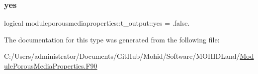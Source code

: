 \mbox{\label{structmoduleporousmediaproperties_1_1t__output_a82afbf45cd736a34347d080a45bc1acd}} 
\subsubsection{\texorpdfstring{yes}{yes}}
{\footnotesize\ttfamily logical moduleporousmediaproperties\+::t\+\_\+output\+::yes = .false.\hspace{0.3cm}{\ttfamily [private]}}



The documentation for this type was generated from the following file\+:\begin{DoxyCompactItemize}
\item 
C\+:/\+Users/administrator/\+Documents/\+Git\+Hub/\+Mohid/\+Software/\+M\+O\+H\+I\+D\+Land/\mbox{\hyperlink{_module_porous_media_properties_8_f90}{Module\+Porous\+Media\+Properties.\+F90}}\end{DoxyCompactItemize}
